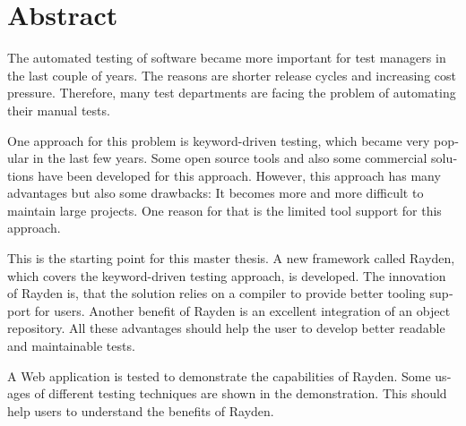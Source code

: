 \chapter{Abstract}

\begin{english} %

The automated testing of software became more important for test managers in the last couple of years. The reasons are shorter release cycles and increasing cost pressure. Therefore, many test departments are facing the problem of automating their manual tests.

\SuperPar
One approach for this problem is keyword-driven testing, which became very popular in the last few years. Some open source tools and also some commercial solutions have been developed for this approach. However, this approach has many advantages but also some drawbacks: It becomes more and more difficult to maintain large projects. One reason for that is the limited tool support for this approach.

\SuperPar
This is the starting point for this master thesis. A new framework called Rayden, which covers the keyword-driven testing approach, is developed. The innovation of Rayden is, that the solution relies on a compiler to provide better tooling support for users. Another benefit of Rayden is an excellent integration of an object repository. All these advantages should help the user to develop better readable and maintainable tests.

\SuperPar
A Web application is tested to demonstrate the capabilities of Rayden. Some usages of different testing techniques are shown in the demonstration. This should help users to understand the benefits of Rayden.

\end{english}
